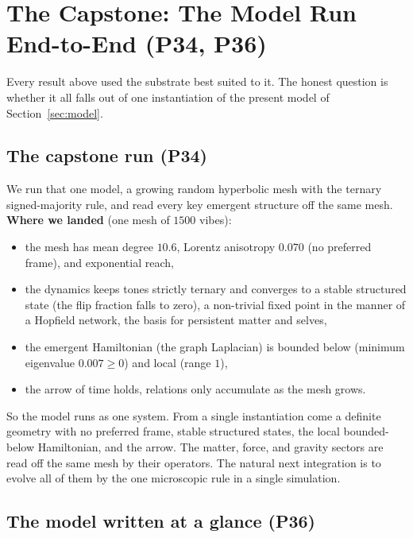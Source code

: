 \section{The Capstone: The Model Run End-to-End (P34, P36)}
\label{sec:capstone}

Every result above used the substrate best suited to it. The honest question is whether
it all falls out of one instantiation of the present model of Section~\ref{sec:model}.

\subsection{The capstone run (P34)}

We run that one model, a growing random hyperbolic mesh with the ternary signed-majority
rule, and read every key emergent structure off the same mesh. \textbf{Where we landed}
(one mesh of $1500$ vibes):
\begin{itemize}
\item the mesh has mean degree $10.6$, Lorentz anisotropy $0.070$ (no preferred frame),
and exponential reach,
\item the dynamics keeps tones strictly ternary and converges to a stable structured
state (the flip fraction falls to zero), a non-trivial fixed point in the manner of a
Hopfield network, the basis for persistent matter and selves,
\item the emergent Hamiltonian (the graph Laplacian) is bounded below (minimum
eigenvalue $0.007 \ge 0$) and local (range $1$),
\item the arrow of time holds, relations only accumulate as the mesh grows.
\end{itemize}
So the model runs as one system. From a single instantiation come a definite geometry
with no preferred frame, stable structured states, the local bounded-below Hamiltonian,
and the arrow. The matter, force, and gravity sectors are read off the same mesh by
their operators. The natural next integration is to evolve all of them by the one
microscopic rule in a single simulation.

\subsection{The model written at a glance (P36)}

